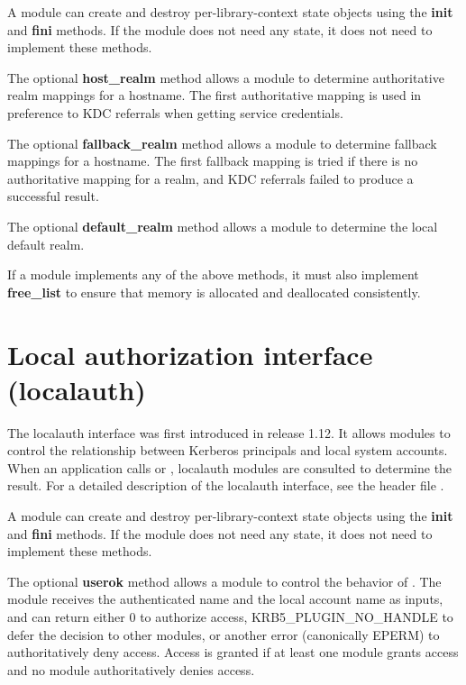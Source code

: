 \documentclass[letterpaper,10pt,english]{sphinxmanual}
\begin{document}
A module can create and destroy per-library-context state objects
using the \textbf{init} and \textbf{fini} methods.  If the module does not need
any state, it does not need to implement these methods.

The optional \textbf{host\_realm} method allows a module to determine
authoritative realm mappings for a hostname.  The first authoritative
mapping is used in preference to KDC referrals when getting service
credentials.

The optional \textbf{fallback\_realm} method allows a module to determine
fallback mappings for a hostname.  The first fallback mapping is tried
if there is no authoritative mapping for a realm, and KDC referrals
failed to produce a successful result.

The optional \textbf{default\_realm} method allows a module to determine the
local default realm.

If a module implements any of the above methods, it must also
implement \textbf{free\_list} to ensure that memory is allocated and
deallocated consistently.


\section{Local authorization interface (localauth)}
\label{plugindev/localauth:local-authorization-interface-localauth}\label{plugindev/localauth:localauth-plugin}\label{plugindev/localauth::doc}
The localauth interface was first introduced in release 1.12.  It
allows modules to control the relationship between Kerberos principals
and local system accounts.  When an application calls
 or , localauth
modules are consulted to determine the result.  For a detailed
description of the localauth interface, see the header file
.

A module can create and destroy per-library-context state objects
using the \textbf{init} and \textbf{fini} methods.  If the module does not need
any state, it does not need to implement these methods.

The optional \textbf{userok} method allows a module to control the behavior
of .  The module receives the authenticated name
and the local account name as inputs, and can return either 0 to
authorize access, KRB5\_PLUGIN\_NO\_HANDLE to defer the decision to other
modules, or another error (canonically EPERM) to authoritatively deny
access.  Access is granted if at least one module grants access and no
module authoritatively denies access.
\end{document}
